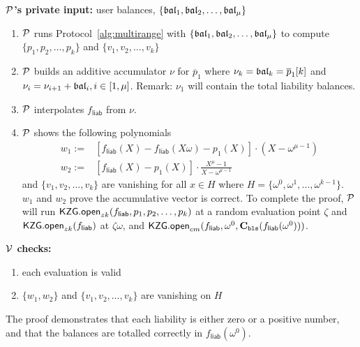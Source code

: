 

\begin{Protocol*}[t!]
\begin{mdframed}
\footnotesize


\textbf{$\mathcal{P}$'s private input:} user balances, $\{\mathfrak{bal}_1,\mathfrak{bal}_2,\dots,\mathfrak{bal}_\mu\}$
\begin{enumerate}
    \item $\mathcal{P}$ runs Protocol~\ref{alg:multirange} with $\{\mathfrak{bal}_1,\mathfrak{bal}_2,\dots,\mathfrak{bal}_\mu\}$ to compute $\{p_1,p_2,\dots,p_k\}$ and $\{v_1,v_2,\dots,v_k\}$
    \item $\mathcal{P}$ builds an additive accumulator $\nu$ for $\overline{p}_1$ where $\nu_k=\mathfrak{bal}_k=\overline{p}_1[k]$ and $\nu_i=\nu_{i+1}+\mathfrak{bal}_i,i\in[1,\mu]$. Remark: $\nu_1$ will contain the total liability balances.
    \item $\mathcal{P}$ interpolates $f_\mathsf{liab}$ from $\nu$.
    \item $\mathcal{P}$ shows the following polynomials
    \begin{align*}
        w_1:=&[f_\mathsf{liab}(X)-f_\mathsf{liab}(X\omega)-p_1(X)]\cdot(X-\omega^{\mu-1}) \\
        w_2:=&[f_\mathsf{liab}(X)-p_1(X)]\cdot\frac{X^\mu-1}{X-\omega^{\mu-1}}
    \end{align*}
    and $\{v_1,v_2,\dots,v_k\}$ are vanishing for all $x\in{H}$ where $H=\{\omega^0,\omega^1,\dots,\omega^{k-1}\}$. \\
    $w_1$ and $w_2$ prove the accumulative vector is correct. To complete the proof, $\mathcal{P}$ will run $\mathsf{KZG.open}_{zk}(f_\mathsf{liab},p_1,p_2,\dots,p_k)$ at a random evaluation point $\zeta$ and $\mathsf{KZG.open}_{zk}(f_\mathsf{liab})$ at $\zeta\omega$, and $\mathsf{KZG.open}_{cm}(f_\mathsf{liab},\omega^0,\textbf{C}_\texttt{bls}(f_\mathsf{liab}(\omega^0)))$.
\end{enumerate}

\textbf{$\mathcal{V}$ checks:}
\begin{enumerate}
    \item each evaluation is valid
    \item $\{w_1,w_2\}$ and $\{v_1,v_2,\dots,v_k\}$ are vanishing on $H$
\end{enumerate}


\normalsize	
\end{mdframed}
\caption{The \pol proof demonstrates that each liability is either zero or a positive number, and that the balances are totalled correctly in $f_\mathsf{liab}(\omega^0)$. \label{alg:pol}}
\end{Protocol*}
